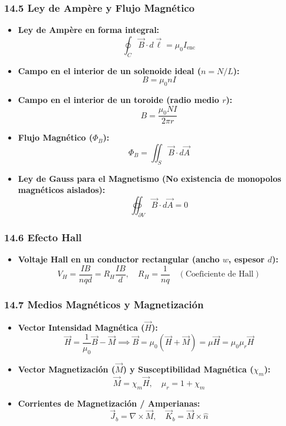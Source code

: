 \documentclass[11pt,a4paper]{article}
\begin{document}
\subsubsection*{14.5 Ley de Ampère y Flujo Magnético}

\begin{itemize}
  \item \textbf{Ley de Ampère en forma integral:}
  \[
    \oint_C \vec{B} \cdot d\vec{\ell} = \mu_0 I_{\text{enc}}
  \]
  \item \textbf{Campo en el interior de un solenoide ideal ($n = N/L$):}
  \[
    B = \mu_0 n I
  \]
  \item \textbf{Campo en el interior de un toroide (radio medio $r$):}
  \[
    B = \frac{\mu_0 N I}{2\pi r}
  \]
  \item \textbf{Flujo Magnético ($\Phi_B$):}
  \[
    \Phi_B = \iint_S \vec{B} \cdot d\vec{A}
  \]
  \item \textbf{Ley de Gauss para el Magnetismo (No existencia de monopolos magnéticos aislados):}
  \[
    \oiint_{\partial V} \vec{B} \cdot d\vec{A} = 0
  \]
\end{itemize}

\subsubsection*{14.6 Efecto Hall}

\begin{itemize}
  \item \textbf{Voltaje Hall en un conductor rectangular (ancho $w$, espesor $d$):}
  \[
    V_H = \frac{I B}{n q d} = R_H \frac{I B}{d}, \quad R_H = \frac{1}{n q} \quad (\text{Coeficiente de Hall})
  \]
\end{itemize}

\subsubsection*{14.7 Medios Magnéticos y Magnetización}

\begin{itemize}
  \item \textbf{Vector Intensidad Magnética ($\vec{H}$):}
  \[
    \vec{H} = \frac{1}{\mu_0}\vec{B} - \vec{M} \implies \vec{B} = \mu_0 (\vec{H} + \vec{M}) = \mu \vec{H} = \mu_0 \mu_r \vec{H}
  \]
  \item \textbf{Vector Magnetización ($\vec{M}$) y Susceptibilidad Magnética ($\chi_m$):}
  \[
    \vec{M} = \chi_m \vec{H}, \quad \mu_r = 1 + \chi_m
  \]
  \item \textbf{Corrientes de Magnetización / Amperianas:}
  \[
    \vec{J}_b = \nabla \times \vec{M}, \quad \vec{K}_b = \vec{M} \times \hat{n}
  \]
\end{itemize}
\end{document}
